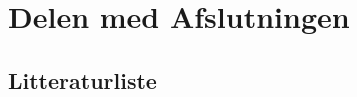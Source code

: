 		
				


\part{Delen med Afslutningen \label{part_afslutning}}






\begin{appendix}
\setcounter{secnumdepth}{3}




% 
% 


%
% 



\end{appendix} 

\newpage


\chapter*{Litteraturliste \label{Litteraturliste}}



